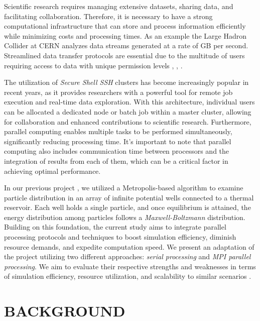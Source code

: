 \documentclass[%
 reprint,
 amsmath,amssymb,
 aps,
]{revtex4-2}
\begin{document}
Scientific research requires managing extensive datasets, sharing data, and facilitating collaboration. Therefore, it is necessary to have a strong computational infrastructure that can store and process information efficiently while minimizing costs and processing times. As an example the Large Hadron Collider at CERN analyzes data streams generated at a rate of GB per second. Streamlined data transfer protocols are essential due to the multitude of users requiring access to data with unique permission levels \cite{jesshope_computational_1986}, \cite{dingle_causality_1970}, \cite{an_science_2019}.

The utilization of \textit{Secure Shell SSH} clusters has become increasingly popular in recent years, as it provides researchers with a powerful tool for remote job execution and real-time data exploration. With this architecture, individual users can be allocated a dedicated node or batch job within a master cluster, allowing for collaboration and enhanced contributions to scientific research. Furthermore, parallel computing enables multiple tasks to be performed simultaneously, significantly reducing processing time. It's important to note that parallel computing also includes communication time between processors and the integration of results from each of them, which can be a critical factor in achieving optimal performance.

In our previous project \cite{hotboxes}, we utilized a Metropolis-based algorithm to examine particle distribution in an array of infinite potential wells connected to a thermal reservoir. Each well holds a single particle, and once equilibrium is attained, the energy distribution among particles follows a \textit{Maxwell-Boltzmann} distribution. Building on this foundation, the current study aims to integrate parallel processing protocols and techniques to boost simulation efficiency, diminish resource demands, and expedite computation speed.
We present an adaptation of the project utilizing two different approaches: \textit{serial processing} and \textit{MPI parallel processing}. We aim to evaluate their respective strengths and weaknesses in terms of simulation efficiency, resource utilization, and scalability to  similar scenarios
\cite{shi_optical_2020} \cite{neophytou_nanostructured_2019} \cite{tsatsulnikov_modulation_1997}.



\section{BACKGROUND}
\end{document}
